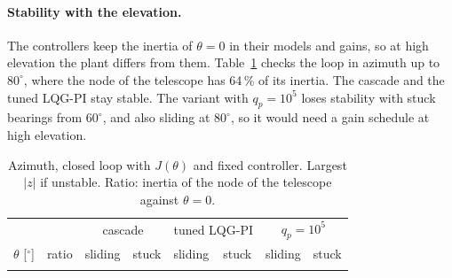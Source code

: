 \documentclass[10pt,a4paper]{article}
\numberwithin{equation}{section}
\begin{document}
\begin{table}[H]\centering\footnotesize\setlength{\tabcolsep}{2.5pt}
\caption{Effect on the line of sight, each term added to the previous one, same controller. Largest torque [N\,m]; rms effect [$\mu$rad] of the torques on azimuth and elevation, of $J(\theta)$ on azimuth, of $H$ on both; peak effect of all terms on azimuth [$\mu$rad]; largest azimuth current [A] with fixed $J$ and with $J(\theta)$. Fast, high circle: centre at 15\,m, radius 10\,m, height 15\,m, 0.5\,rad/s.}\label{tab:coupled}
\end{table}

\paragraph{Stability with the elevation.} The controllers keep the inertia of $\theta=0$ in their models and gains, so at high elevation the plant differs from them. Table~\ref{tab:stabtheta} checks the loop in azimuth up to $80^\circ$, where the node of the telescope has 64\,\% of its inertia. The cascade and the tuned LQG-PI stay stable. The variant with $q_p=10^5$ loses stability with stuck bearings from $60^\circ$, and also sliding at $80^\circ$, so it would need a gain schedule at high elevation.

\begin{table}[H]\centering\footnotesize\setlength{\tabcolsep}{4pt}
\caption{Azimuth, closed loop with $J(\theta)$ and fixed controller. Largest $|z|$ if unstable. Ratio: inertia of the node of the telescope against $\theta=0$.}\label{tab:stabtheta}
\begin{tabular}{rrllllll}\toprule
& & \multicolumn{2}{c}{cascade} & \multicolumn{2}{c}{tuned LQG-PI} & \multicolumn{2}{c}{$q_p=10^5$} \\
\cmidrule(lr){3-4}\cmidrule(lr){5-6}\cmidrule(lr){7-8}
$\theta$ [$^\circ$] & ratio & sliding & stuck & sliding & stuck & sliding & stuck \\ \midrule
\\ \bottomrule
\end{tabular}\end{table}
\end{document}

